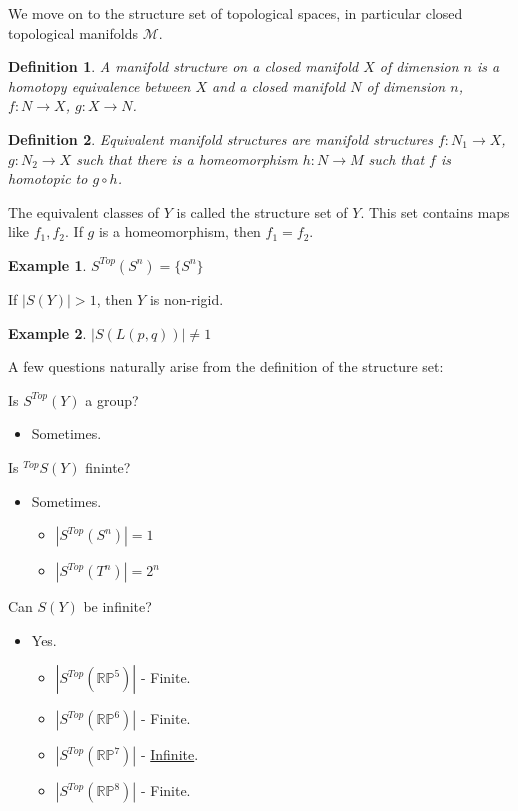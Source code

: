 \documentclass{article}
\theoremstyle{mystyle}
\newtheorem{definition}{Definition}[section]
\newtheorem{example}{Example}[section]
\begin{document}
We move on to the structure set of topological spaces, in particular closed topological manifolds $\mathcal{M}$.
\begin{definition}
A manifold structure on a closed manifold $X$ of dimension $n$ is a homotopy equivalence between $X$ and a closed manifold $N$ of dimension $n$, $f:N\rightarrow X$, $g:X\rightarrow N$.
\end{definition}
\begin{definition}
Equivalent manifold structures are manifold structures $f:N_{1}\rightarrow X$, $g:N_{2}\rightarrow X$ such that there is a homeomorphism $h:N\rightarrow M$ such that $f$ is homotopic to $g\circ h$.
\end{definition}
The equivalent classes of $Y$ is called the structure set of $Y$. This set contains maps like $f_{1},f_{2}$. If $g$ is a homeomorphism, then $f_{1} = f_{2}$.
\begin{example}
$S^{Top}(S^{n}) = \{S^{n}\}$
\end{example}
If $|S(Y)|>1$, then $Y$ is non-rigid.
\begin{example}
$|S(L(p,q))| \ne 1$
\end{example}
A few questions naturally arise from the definition of the structure set:
\begin{enumerate}
\begin{multicols}{2}
    \item Is $S^{Top}(Y)$ a group?
    \begin{itemize}
        \item Sometimes.
    \end{itemize}
    \item Is $^{Top}S(Y)$ fininte?
    \begin{itemize}
        \item Sometimes.
        \begin{itemize}
            \item $|S^{Top}(S^{n})| = 1$
            \item $|S^{Top}(T^{n})| = 2^{n}$
        \end{itemize}
    \end{itemize}
    \item Can $S(Y)$ be infinite?
    \begin{itemize}
        \item Yes.
        \begin{itemize}
            \item $|S^{Top}(\mathbb{RP}^{5})|$ - Finite.
            \item $|S^{Top}(\mathbb{RP}^{6})|$ - Finite.
            \item $|S^{Top}(\mathbb{RP}^{7})|$ - \underline{Infinite}.
            \item $|S^{Top}(\mathbb{RP}^{8})|$ - Finite.
        \end{itemize}
    \end{itemize}
\end{multicols}
\end{enumerate}
\end{document}
